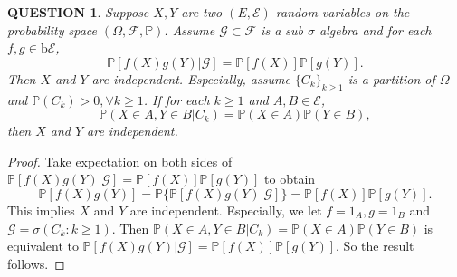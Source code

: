 \documentclass[12pt]{article}
\renewcommand{\(}{\left(}%
\renewcommand{\)}{\right)}%
\renewcommand{\[}{\left[}%
\renewcommand{\]}{\right]}%
\newcommand{\p}{\mathbb{P}}
\newcommand{\f}{\mathscr{F}}
\newcommand{\e}{\mathscr{E}}
\newcommand{\g}{\mathscr{G}}
\newtheorem{question}{QUESTION}[section]}
\newtheorem{proof}{Proof.}}
\begin{document}
  \begin{question}
   Suppose $X,Y$ are two $(E,\e)$ random variables on the probability space $(\Omega,\f,\p )$. Assume $\g\subset \f$ is a sub $\sigma$ algebra and for each $f,g\in\mathrm{b}\e$,
   \begin{equation*}
    \p[f(X)g(Y)|\g]=\p[f(X)]\p[g(Y)].
   \end{equation*}
   Then $X$ and $Y$ are independent. Especially,
   assume $\{C_k\}_{k\geq 1}$ is a partition of $\Omega$ and $\p(C_k)>0,\forall k\geq 1$. If for each $k\geq 1$ and $A,B\in\e$,
   \begin{equation*}
    \p(X\in A,Y\in B|C_k)=\p(X\in A)\p(Y\in B),
   \end{equation*}
   then $X$ and $Y$ are independent.
  \end{question}
  \begin{proof}
   Take expectation on both sides of $\p[f(X)g(Y)|\g]=\p[f(X)]\p[g(Y)]$ to obtain
   \begin{equation*}
    \p[f(X)g(Y)]=\p\{\p[f(X)g(Y)|\g]\}=\p[f(X)]\p[g(Y)].
   \end{equation*}
   This implies $X$ and $Y$ are independent. Especially, we let $f=1_A,g=1_B$ and $\g=\sigma(C_k:k\geq 1)$. Then $\p(X\in A,Y\in B|C_k)=\p(X\in A)\p(Y\in B)$ is equivalent to $\p[f(X)g(Y)|\g]=\p[f(X)]\p[g(Y)]$. So the result follows.
  \end{proof}
\end{document}
